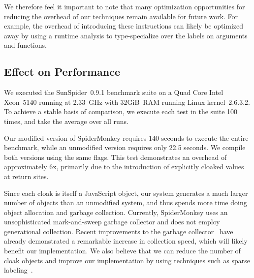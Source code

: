 We therefore feel it important to note that many optimization opportunities for reducing the overhead of our techniques remain available for future work.
For example, the overhead of introducing these instructions can likely be optimized away by using a runtime analysis to type-specialize over the labels on arguments and functions.

\subsection{Effect on Performance}
\label{sec:evaluation-performance}

We executed the SunSpider~0.9.1 benchmark suite on a Quad Core Intel Xeon~5140 running at 2.33~GHz with 32GiB~RAM running Linux kernel~2.6.3.2.
To achieve a stable basis of comparison, we execute each test in the suite 100 times, and take the average over all runs.

Our modified version of SpiderMonkey requires 140 seconds to execute the entire benchmark, while an unmodified version requires only 22.5 seconds.
We compile both versions using the same flags.
This test demonstrates an overhead of approximately 6x, primarily due to the introduction of explicitly cloaked values at return sites.

Since each cloak is itself a JavaScript object, our system generates a much larger number of objects than an unmodified system, and thus spends more time doing object allocation and garbage collection.
Currently, SpiderMonkey uses an unsophisticated mark-and-sweep garbage collector and does not employ generational collection.
Recent improvements to the garbage collector~\cite{wagner2011} have already demonstrated a remarkable increase in collection speed, which will likely benefit our implementation.
We also believe that we can reduce the number of cloak objects and improve our implementation by using techniques such as sparse labeling~\cite{1554353,1814220}.


